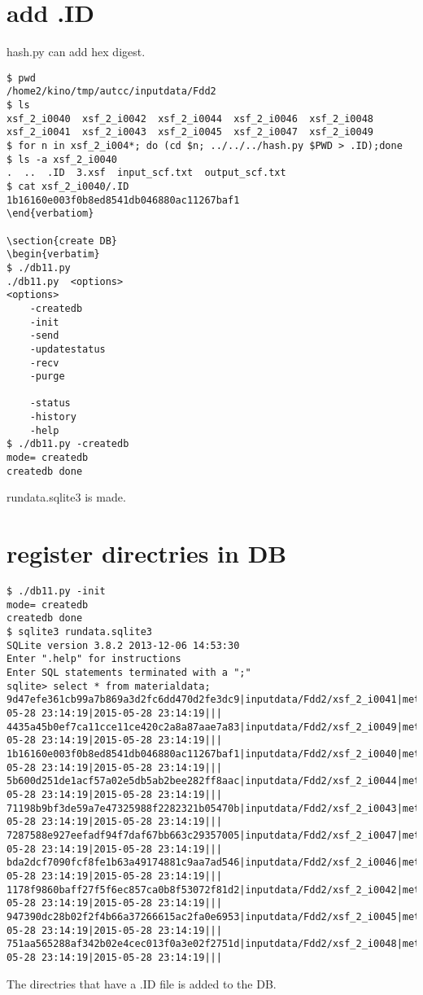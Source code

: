 \documentclass[a4paper]{article}
\begin{document}
\section{add .ID}
hash.py can add hex digest.
\begin{verbatim}
$ pwd
/home2/kino/tmp/autcc/inputdata/Fdd2
$ ls
xsf_2_i0040  xsf_2_i0042  xsf_2_i0044  xsf_2_i0046  xsf_2_i0048
xsf_2_i0041  xsf_2_i0043  xsf_2_i0045  xsf_2_i0047  xsf_2_i0049
$ for n in xsf_2_i004*; do (cd $n; ../../../hash.py $PWD > .ID);done
$ ls -a xsf_2_i0040
.  ..  .ID  3.xsf  input_scf.txt  output_scf.txt
$ cat xsf_2_i0040/.ID 
1b16160e003f0b8ed8541db046880ac11267baf1
\end{verbatiom}

\section{create DB}
\begin{verbatim}
$ ./db11.py
./db11.py  <options>
<options>
	-createdb
	-init
	-send
	-updatestatus
	-recv
	-purge

	-status
	-history
	-help
$ ./db11.py -createdb
mode= createdb
createdb done
\end{verbatim}
rundata.sqlite3 is made.

\section{register directries in DB}
\begin{verbatim}
$ ./db11.py -init
mode= createdb
createdb done
$ sqlite3 rundata.sqlite3
SQLite version 3.8.2 2013-12-06 14:53:30
Enter ".help" for instructions
Enter SQL statements terminated with a ";"
sqlite> select * from materialdata;
9d47efe361cb99a7b869a3d2fc6dd470d2fe3dc9|inputdata/Fdd2/xsf_2_i0041|metal1|new|0|idle|2015-05-28 23:14:19|2015-05-28 23:14:19|||
4435a45b0ef7ca11cce11ce420c2a8a87aae7a83|inputdata/Fdd2/xsf_2_i0049|metal1|new|0|idle|2015-05-28 23:14:19|2015-05-28 23:14:19|||
1b16160e003f0b8ed8541db046880ac11267baf1|inputdata/Fdd2/xsf_2_i0040|metal1|new|0|idle|2015-05-28 23:14:19|2015-05-28 23:14:19|||
5b600d251de1acf57a02e5db5ab2bee282ff8aac|inputdata/Fdd2/xsf_2_i0044|metal1|new|0|idle|2015-05-28 23:14:19|2015-05-28 23:14:19|||
71198b9bf3de59a7e47325988f2282321b05470b|inputdata/Fdd2/xsf_2_i0043|metal1|new|0|idle|2015-05-28 23:14:19|2015-05-28 23:14:19|||
7287588e927eefadf94f7daf67bb663c29357005|inputdata/Fdd2/xsf_2_i0047|metal1|new|0|idle|2015-05-28 23:14:19|2015-05-28 23:14:19|||
bda2dcf7090fcf8fe1b63a49174881c9aa7ad546|inputdata/Fdd2/xsf_2_i0046|metal1|new|0|idle|2015-05-28 23:14:19|2015-05-28 23:14:19|||
1178f9860baff27f5f6ec857ca0b8f53072f81d2|inputdata/Fdd2/xsf_2_i0042|metal1|new|0|idle|2015-05-28 23:14:19|2015-05-28 23:14:19|||
947390dc28b02f2f4b66a37266615ac2fa0e6953|inputdata/Fdd2/xsf_2_i0045|metal1|new|0|idle|2015-05-28 23:14:19|2015-05-28 23:14:19|||
751aa565288af342b02e4cec013f0a3e02f2751d|inputdata/Fdd2/xsf_2_i0048|metal1|new|0|idle|2015-05-28 23:14:19|2015-05-28 23:14:19|||
\end{verbatim}
The directries that have a .ID file is added to the DB.
\end{document}
